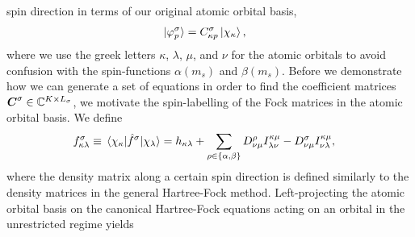             spin direction in terms of our original atomic orbital basis,
            \begin{align}
                \ket*{\varphi^{\sigma}_{p}}
                &= C^{\sigma}_{\kappa p} \ket*{\chi_{\kappa}},
            \end{align}
            where we use the greek letters $\kappa$, $\lambda$, $\mu$, and $\nu$
            for the atomic orbitals to avoid confusion with the spin-functions
            $\alpha(m_s)$ and $\beta(m_s)$.
            Before we demonstrate how we can generate a set of equations in
            order to find the coefficient matrices $\boldsymbol{C}^{\sigma} \in
            \mathbb{C}^{K \times L_{\sigma}}$, we motivate the spin-labelling of
            the Fock matrices in the atomic orbital basis.
            We define
            \begin{align}
                f^{\sigma}_{\kappa\lambda}
                &\equiv
                \mel*{\chi_{\kappa}}{\hat{f}^{\sigma}}{\chi_{\lambda}}
                =
                h_{\kappa\lambda}
                + \sum_{\rho \in \left\{ \alpha, \beta \right\}}
                D^{\rho}_{\nu\mu}
                I^{\kappa\mu}_{\lambda\nu}
                -
                D^{\sigma}_{\nu\mu}
                I^{\kappa\mu}_{\nu\lambda},
            \end{align}
            where the density matrix along a certain spin direction is defined
            similarly to the density matrices in the general Hartree-Fock
            method.
            Left-projecting the atomic orbital basis on the canonical
            Hartree-Fock equations acting on an orbital in the unrestricted
            regime yields
